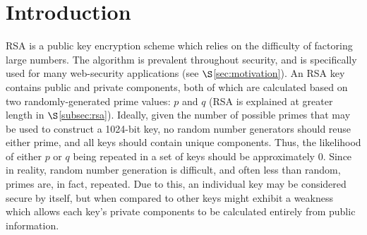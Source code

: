 \documentclass[12pt]{ucthesis}
\begin{document}

\chapter{Introduction}
\label{sec:intro}
RSA is a public key encryption scheme which relies on the difficulty of 
factoring large numbers. The algorithm is prevalent throughout security, and is 
specifically used for many web-security applications (see
$\S$\ref{sec:motivation}). An RSA key contains public and private components,
both of which are calculated based on two randomly-generated prime values: $p$
and $q$ (RSA is explained at greater length in $\S$\ref{subsec:rsa}). Ideally,
given the number of possible primes that may be used to construct a 1024-bit
key, no random number generators should reuse either prime, and all keys should
contain unique components. Thus, the likelihood of either $p$ or $q$ being
repeated in a set of keys should be approximately 0. Since in reality, random
number generation is difficult, and often less than random, primes are, in fact,
repeated. Due to this, an individual key may be considered secure by itself, but
when compared to other keys might exhibit a weakness which allows each key's
private components to be calculated entirely from public information.
\end{document}

